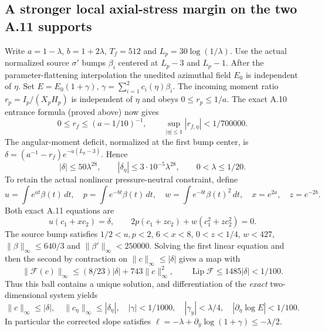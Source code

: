 \subsection*{A stronger local axial-stress margin on the two A.11 supports}
\label{subsec:A11-strong-20261021}
Write $a=1-\lambda$, $b=1+2\lambda$, $T_f=512$ and
$L_p=30\log(1/\lambda)$. Use the actual normalized source
$\sigma'$ bumps $\beta_i$ centered at $L_p-3$ and $L_p-1$.
After the parameter-flattening interpolation the unedited
azimuthal field $E_0$ is independent of $\eta$.
Set $E=E_0(1+\gamma)$,
$\gamma=\sum_{i=1}^{2}c_i(\eta)\beta_i$.
The incoming moment ratio $r_p=I_p/(X_pH_p)$ is independent
of $\eta$ and obeys $0\le r_p\le1/a$.
The exact A.10 entrance formula (proved above) now gives
\[
 0\le r_f\le(a-1/10)^{-1},\qquad
 \sup_{|\eta|\le1}|r_{f,\eta}|<1/700000.
\]
The angular-moment deficit, normalized at the first bump center,
is $\delta=(a^{-1}-r_f)e^{-a(L_p-3)}$. Hence
\begin{equation}\label{eq:A11-strong-delta}
 |\delta|\le50\lambda^{28},\qquad
 |\delta_\eta|\le3\cdot10^{-5}\lambda^{28},
 \qquad0<\lambda\le1/20.
\end{equation}
To retain the actual nonlinear pressure-neutral constraint, define
\[
 u=\int e^{at}\beta(t)\,dt,\quad
 p=\int e^{-bt}\beta(t)\,dt,\quad
 w=\int e^{-bt}\beta(t)^2\,dt,\quad
 x=e^{2a},\quad z=e^{-2b}.
\]
Both exact A.11 equations are
\[
 u(c_1+xc_2)=\delta,\qquad
 2p(c_1+zc_2)+w(c_1^2+zc_2^2)=0.
\]
The source bump satisfies $1/2<u,p<2$, $6<x<8$,
$0<z<1/4$, $w<427$,
$\|\beta\|_\infty\le640/3$ and
$\|\beta'\|_\infty<250000$. Solving the first linear
equation and then the second by contraction on
$\|c\|_\infty\le|\delta|$ gives a map with
\[
 \|\mathcal F(c)\|_\infty
 \le(8/23)|\delta|+743\|c\|_\infty^2,\qquad
 \operatorname{Lip}\mathcal F\le1485|\delta|<1/100.
\]
Thus this ball contains a unique solution, and
differentiation of the \emph{exact} two-dimensional system yields
\[
 \|c\|_\infty\le|\delta|,\quad
 \|c_\eta\|_\infty\le|\delta_\eta|,\quad
 |\gamma|<1/1000,\quad |\gamma_y|<\lambda/4,\quad
 |\partial_\eta\log E|<1/100.
\]
In particular the corrected slope satisfies
$\ell=-\lambda+\partial_y\log(1+\gamma)\le-\lambda/2$.

